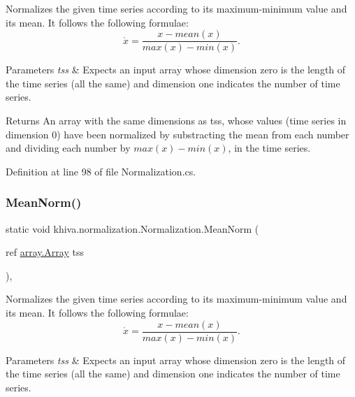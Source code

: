 Normalizes the given time series according to its maximum-\/minimum value and its mean. It follows the following formulae\+: \[ \acute{x} = \frac{x - mean(x)}{max(x) - min(x)}. \] 


\begin{DoxyParams}{Parameters}
{\em tss} & Expects an input array whose dimension zero is the length of the time series (all the same) and dimension one indicates the number of time series.\\
\hline
\end{DoxyParams}
\begin{DoxyReturn}{Returns}
An array with the same dimensions as tss, whose values (time series in dimension 0) have been normalized by substracting the mean from each number and dividing each number by $ max(x) - min(x)$, in the time series.
\end{DoxyReturn}


Definition at line 98 of file Normalization.\+cs.

\mbox{\label{classkhiva_1_1normalization_1_1_normalization_a0ea50b378b754403bf80a895a7ddb63f}} 
\subsubsection{\texorpdfstring{Mean\+Norm()}{MeanNorm()}\hspace{0.1cm}{\footnotesize\ttfamily [2/2]}}
{\footnotesize\ttfamily static void khiva.\+normalization.\+Normalization.\+Mean\+Norm (\begin{DoxyParamCaption}\item[{ref \mbox{\hyperlink{classkhiva_1_1array_1_1_array}{array.\+Array}}}]{tss }\end{DoxyParamCaption})\hspace{0.3cm}{\ttfamily [inline]}, {\ttfamily [static]}}



Normalizes the given time series according to its maximum-\/minimum value and its mean. It follows the following formulae\+: \[ \acute{x} = \frac{x - mean(x)}{max(x) - min(x)}. \] 


\begin{DoxyParams}{Parameters}
{\em tss} & Expects an input array whose dimension zero is the length of the time series (all the same) and dimension one indicates the number of time series.\\
\hline
\end{DoxyParams}


